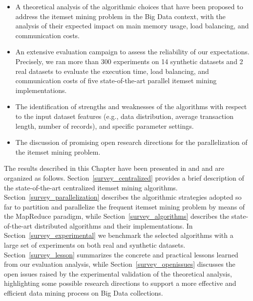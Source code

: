 \begin{itemize}
\item A theoretical analysis of the algorithmic choices that have been proposed to address the itemset mining problem 
in the Big Data context, with the analysis of their expected impact on main memory usage, load balancing, and communication costs. 

\item An extensive evaluation campaign to assess the reliability of our expectations.
Precisely, we ran more than 300 experiments on 14 synthetic datasets and 2 real datasets to evaluate the execution time, load balancing, and communication costs
of five state-of-the-art parallel itemset mining implementations. 

\item The identification of strengths and weaknesses of the algorithms 
with respect to 
the input dataset features (e.g., data distribution, average  transaction length, number of records), 
and specific parameter settings. 

\item The discussion of promising open research directions for the parallelization of the itemset mining problem.

\end{itemize}

The results described in this Chapter have been presented in \cite{apiletti2015review} and \cite{survey_pulvi} and are organized as follows. Section~\ref{survey_centralized} provides a brief description of the state-of-the-art centralized itemset mining algorithms. 
Section~\ref{survey_parallelization} describes the algorithmic strategies adopted so far to partition and parallelize the frequent itemset mining problem by means of the MapReduce paradigm, while 
Section~\ref{survey_algorithms} describes the state-of-the-art distributed algorithms and their implementations.
In Section~\ref{survey_experimental} we benchmark the selected algorithms with a large set of experiments on both real and synthetic datasets.
Section~\ref{survey_lesson} summarizes the concrete and practical lessons learned from our evaluation analysis, while Section~\ref{survey_openissues} discusses the open issues raised by the experimental validation of the theoretical analysis, highlighting some possible research directions to support a more effective and efficient data mining process on Big Data collections. 

